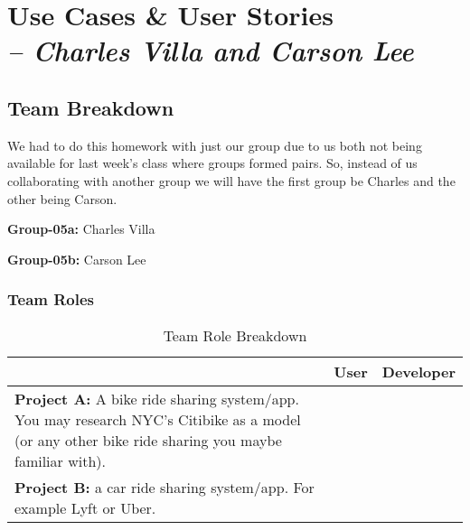 \chapter{Use Cases \& User Stories \\
\small{\textit{-- Charles Villa and Carson Lee}}
\label{Chapter::UseCasesAndUserStories}}

\normalsize
\section{Team Breakdown}
We had to do this homework with just our group due to us both not being available for last week's class where groups formed pairs. So, instead of us collaborating with another group we will have the first group be Charles and the other being Carson. 

\textbf{Group-05a:} Charles Villa

\textbf{Group-05b:} Carson Lee

\subsection{Team Roles}
\begin{longtable}{|p{6cm}|p{3cm}|p{3cm}|}
    \caption{Team Role Breakdown \label{Table::TeamRoles}}\\
    \hline
     & \centering\textbf{User} & \centering\textbf{Developer} \arraybackslash\\ 
    \hline
    \textbf{Project A:} A bike ride sharing system/app. You may research NYC's Citibike as a model (or any other bike ride sharing you maybe familiar with). & \centering{Group 5a} & \centering{Group 5b} \arraybackslash \\
    \hline
    \textbf{Project B:} a car ride sharing system/app.  For example Lyft or Uber. &  \centering{Group 5b} & \centering{Group 5a} \arraybackslash \\
    \hline
\end{longtable}

